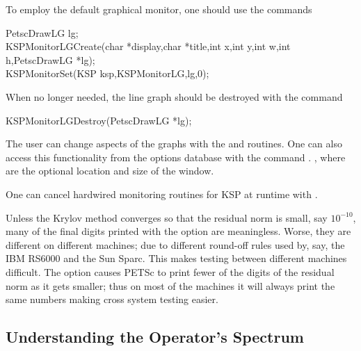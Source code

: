 To employ the default graphical monitor, one should use the 
commands 
\begin{tabbing}
   PetscDrawLG lg;\\
  KSPMonitorLGCreate(char *display,char *title,int x,int y,int w,int h,PetscDrawLG *lg);\\
  KSPMonitorSet(KSP ksp,KSPMonitorLG,lg,0);
\end{tabbing}
When no longer needed, the line graph should be destroyed 
with the command
\begin{tabbing}
  KSPMonitorLGDestroy(PetscDrawLG *lg);
\end{tabbing}
The user can change aspects of the graphs with the  and 
 routines.  
One can also access this functionality from the options database 
with the command  \trl{[x,y,w,h]}. , 
where  are the optional location and size of the window.

One can cancel hardwired monitoring routines for KSP at runtime with 
. 

Unless the Krylov method converges so that the residual norm is small,
say $ 10^{-10} $, many of the final digits printed with the 
option are meaningless. Worse, they are different on different 
machines; due to different round-off rules used by, say, the IBM RS6000
and the Sun Sparc. This makes testing between different machines
difficult. The option  
causes PETSc to print fewer of the digits of the residual norm 
as it gets smaller; thus on most of the machines it will always
print the same numbers making cross system testing easier.


\subsection{Understanding the Operator's Spectrum}

